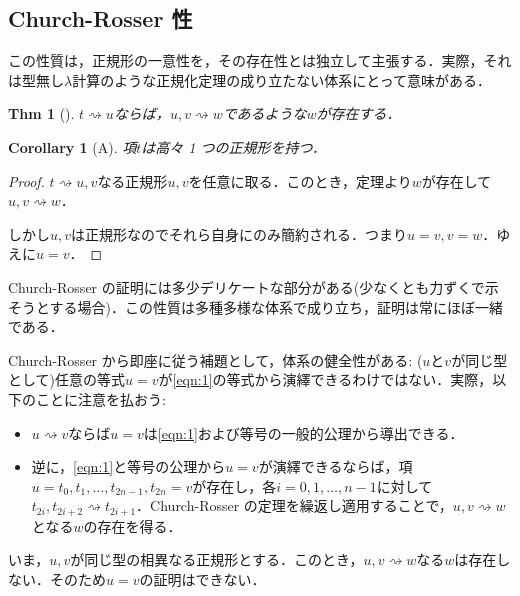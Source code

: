 \documentclass[a4paper,10pt,platex, dvipdfmx]{jsarticle}
\newtheorem{thm}{Thm}
\newtheorem{corollary}{Corollary}
\begin{document}
\subsection{Church-Rosser 性}
この性質は，正規形の一意性を，その存在性とは独立して主張する．実際，それは型無し$\lambda$計算のような正規化定理の成り立たない体系にとって意味がある．
\begin{thm}[]
    $t\rightsquigarrow u$ならば，$u, v\rightsquigarrow w$であるような$w$が存在する．
\end{thm}
\begin{figure}[H]
    \centering
{}
\end{figure}
\begin{corollary}[A]
    項$t$は高々 1 つの正規形を持つ．
\end{corollary}
\begin{proof}
    $t \rightsquigarrow u ,v$なる正規形$u, v$を任意に取る．このとき，定理より$w$が存在して$u, v\rightsquigarrow w$．

    しかし$u, v$は正規形なのでそれら自身にのみ簡約される．つまり$u = v, v = w$．ゆえに$u = v$．
\end{proof}
Church-Rosser の証明には多少デリケートな部分がある(少なくとも力ずくで示そうとする場合)．この性質は多種多様な体系で成り立ち，証明は常にほぼ一緒である．

Church-Rosser から即座に従う補題として，体系の健全性がある: ($u$と$v$が同じ型として)任意の等式$u = v$が\ref{eqn:1}の等式から演繹できるわけではない．実際，以下のことに注意を払おう:\begin{itemize}
\item $u\rightsquigarrow    v$ならば$u = v$は\ref{eqn:1}および等号の一般的公理から導出できる．
\item 逆に，\ref{eqn:1}と等号の公理から$u =v$が演繹できるならば，項$u = t_{0},t_{1},\ldots ,t_{2n - 1}, t_{2n} = v$が存在し，各$i = 0, 1, \ldots , n - 1$に対して$t_{2i}, t_{2i+2}\rightsquigarrow t_{2i+1}$．Church-Rosser の定理を繰返し適用することで，$u ,v\rightsquigarrow w$となる$w$の存在を得る．
\end{itemize}
いま，$u,v$が同じ型の相異なる正規形とする．このとき，$u, v\rightsquigarrow w$なる$w$は存在しない．そのため$u = v$の証明はできない．
\end{document}
